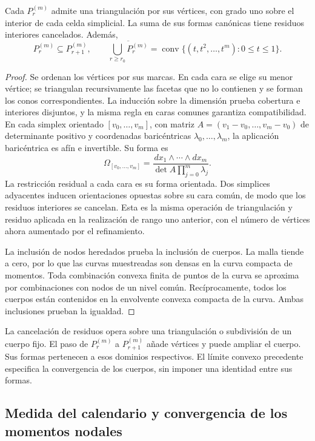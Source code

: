 \begin{proposition}
\label{prop:dim-polytopes}
Cada \(P_r^{(m)}\) admite una triangulación por sus vértices, con
grado uno sobre el interior de cada celda simplicial. La suma de sus
formas canónicas tiene residuos interiores cancelados. Además,
\[
 P_r^{(m)}\subseteq P_{r+1}^{(m)},\qquad
 \overline{\bigcup_{r\geq r_0}P_r^{(m)}}=
 \operatorname{conv}\{(t,t^2,\ldots,t^m):0\leq t\leq1\}.
\]
\end{proposition}
\begin{proof}
Se ordenan los vértices por sus marcas. En cada cara se elige su menor
vértice; se triangulan recursivamente las facetas que no lo contienen
y se forman los conos correspondientes. La inducción sobre la dimensión
prueba cobertura e interiores disjuntos, y la misma regla en caras
comunes garantiza compatibilidad. En cada simplex orientado
\([v_0,\ldots,v_m]\), con matriz
\(A=(v_1-v_0,\ldots,v_m-v_0)\) de determinante positivo y
coordenadas baricéntricas \(\lambda_0,\ldots,\lambda_m\), la
aplicación baricéntrica es afín e invertible. Su forma es
\[
 \Omega_{[v_0,\ldots,v_m]}=
 \frac{dx_1\wedge\cdots\wedge dx_m}
 {\det A\prod_{j=0}^{m}\lambda_j}.
\]
La restricción residual a cada cara es su forma orientada. Dos simplices
adyacentes inducen orientaciones opuestas sobre su cara común, de modo
que los residuos interiores se cancelan. Esta es la misma operación de
triangulación y residuo aplicada en la realización de rango uno anterior,
con el número de vértices ahora aumentado por el refinamiento.

La inclusión de nodos heredados prueba la inclusión de cuerpos. La malla
tiende a cero, por lo que las curvas muestreadas son densas en la curva
compacta de momentos. Toda combinación convexa finita de puntos de la
curva se aproxima por combinaciones con nodos de un nivel común.
Recíprocamente, todos los cuerpos están contenidos en la envolvente
convexa compacta de la curva. Ambas inclusiones prueban la igualdad.
\end{proof}

La cancelación de residuos opera sobre una triangulación o subdivisión
de un cuerpo fijo. El paso de \(P_r^{(m)}\) a \(P_{r+1}^{(m)}\)
añade vértices y puede ampliar el cuerpo. Sus formas pertenecen a esos
dominios respectivos. El límite convexo precedente especifica la
convergencia de los cuerpos, sin imponer una identidad entre sus formas.

\subsection{Medida del calendario y convergencia de los momentos nodales}

